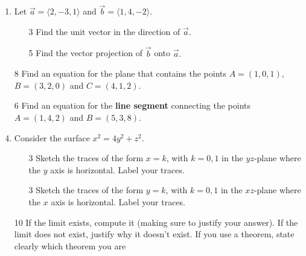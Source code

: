 \documentclass[addpoints,12pt]{exam}
\begin{document}
\begin{enumerate}
\item Let $\vec{a} = \langle 2, -3, 1 \rangle $ and $\vec{b} = \langle 1, 4, -2 \rangle.$
\begin{itemize}
\item[3] Find the unit vector in the direction of $\vec{a}.$
\vfill
\item[5] Find the vector projection of $\vec{b}$ onto $\vec{a}.$
\vfill
\end{itemize}
\newpage
\item[8] Find an equation for the plane that contains the points $A = (1,0,1),$ $B = (3, 2, 0)$
and $C = (4, 1, 2).$
\newpage
\item[6] Find an equation for the {\bf line segment} connecting the points $A = (1,4, 2)$ and
$B = (5, 3, 8).$
\newpage
\item Consider the surface $x^2 =4y^2 + z^2$.
\begin{itemize}
\item[3] Sketch the traces of the form $x = k$, with $ k =0, 1$ in the $yz$-plane where the $y$
axis is horizontal. Label your traces.
\begin{center}
\end{center}
\vfill
\item[3] Sketch the traces of the form $y = k$, with $ k =0, 1 $ in the $xz$-plane where the $x$
axis is horizontal. Label your traces.
\begin{center}
\end{center}
\vfill
\end{itemize}
\newpage
\item[10] If the limit exists, compute it (making sure to justify your answer). If the limit does
not exist, justify why it doesn’t exist. If you use a theorem, state clearly which theorem you are

\end{enumerate}
\end{document}
